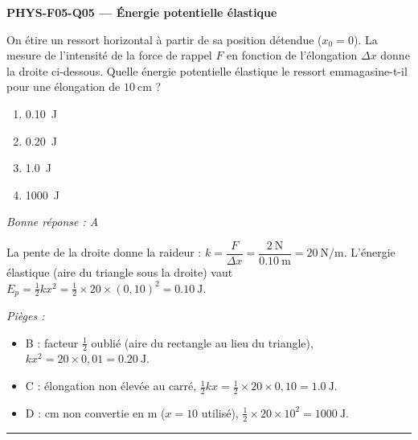 \documentclass[11pt,a4paper]{article}
\begin{document}
\noindent\textbf{PHYS-F05-Q05 --- Énergie potentielle élastique}\par
On étire un ressort horizontal à partir de sa position détendue ($x_0=0$). La mesure de l'intensité
de la force de rappel $F$ en fonction de l'élongation $\Delta x$ donne la droite ci-dessous. Quelle
énergie potentielle élastique le ressort emmagasine-t-il pour une élongation de $\qty{10}{\centi\metre}$ ?
\begin{center}
\end{center}
\begin{enumerate}[label=\Alph*)]
\item \qty{0.10}{\joule}
\item \qty{0.20}{\joule}
\item \qty{1.0}{\joule}
\item \qty{1000}{\joule}
\end{enumerate}
\textit{Bonne réponse : A}\par
La pente de la droite donne la raideur : $k=\dfrac{F}{\Delta x}=\dfrac{\qty{2}{\newton}}{\qty{0.10}{\metre}}=\qty{20}{\newton\per\metre}$.
L'énergie élastique (aire du triangle sous la droite) vaut
$E_p=\tfrac12 k x^2=\tfrac12\times20\times(0{,}10)^2=\qty{0.10}{\joule}$.\par
\textit{Pièges :}
\begin{itemize}
\item B : facteur $\tfrac12$ oublié (aire du rectangle au lieu du triangle), $k x^2=20\times0{,}01=\qty{0.20}{\joule}$.
\item C : élongation non élevée au carré, $\tfrac12 k x=\tfrac12\times20\times0{,}10=\qty{1.0}{\joule}$.
\item D : \si{\centi\metre} non convertie en \si{\metre} ($x=10$ utilisé), $\tfrac12\times20\times10^2=\qty{1000}{\joule}$.
\end{itemize}
\vspace{8pt}\hrule\vspace{8pt}
\end{document}

